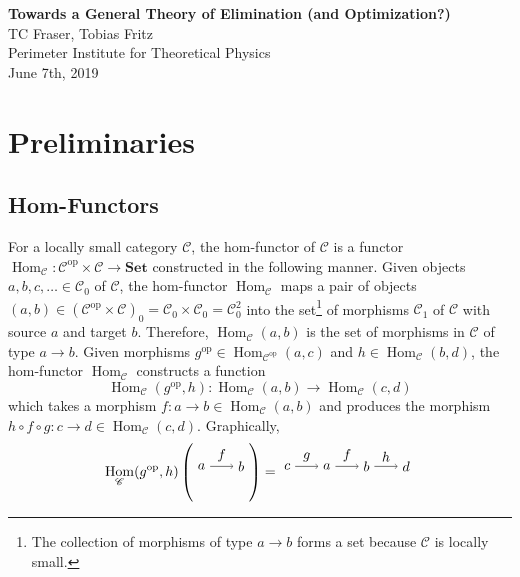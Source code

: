 \documentclass[12pt]{article}
\theoremstyle{definition}
\theoremstyle{remark}
\newcommand{\opcat}{\mathrm{op}}
\DeclareMathOperator{\Hom}{Hom}
\begin{document}
\begin{center}
    \large{\textbf{Towards a General Theory of Elimination (and Optimization?)}} \\
    \normalsize{TC Fraser, Tobias Fritz} \\
    \normalsize{Perimeter Institute for Theoretical Physics} \\
    \normalsize{June 7th, 2019}
\end{center}

\newcommand{\catA}{\mathscr{A}}
\newcommand{\catB}{\mathscr{B}}
\newcommand{\catC}{\mathscr{C}}
\newcommand{\catD}{\mathscr{D}}
\newcommand{\catE}{\mathscr{E}}

\section{Preliminaries}

\subsection{Hom-Functors}
For a locally small category $\catC$, the hom-functor of $\catC$ is a functor $\Hom_{\catC} : \catC^{\opcat} \times \catC \to \mathbf{Set}$ constructed in the following manner. Given objects $a,b,c,\ldots \in \catC_0$ of $\catC$, the hom-functor $\Hom_{\catC}$ maps a pair of objects $(a,b) \in (\catC^\opcat \times \catC)_0 = \catC_0 \times \catC_0 = \catC_0^2$ into the set\footnote{The collection of morphisms of type $a \to b$ forms a set because $\catC$ is locally small.} of morphisms $\catC_1$ of $\catC$ with source $a$ and target $b$. Therefore, $\Hom_{\catC}(a,b)$ is the set of morphisms in $\catC$ of type $a \to b$. Given morphisms $g^{\opcat} \in \Hom_{\catC^{\opcat}}(a,c)$ and $h \in \Hom_{\catC}(b,d)$, the hom-functor $\Hom_{\catC}$ constructs a function
\[ \Hom_{\catC}(g^{\opcat}, h) : \Hom_{\catC}(a,b) \to \Hom_{\catC}(c,d) \]
which takes a morphism $f : a \to b \in \Hom_{\catC}(a,b)$ and produces the morphism $h \circ f \circ g : c \to d \in \Hom_{\catC}(c,d)$. Graphically,
\[
    \Hom_{\catC}(g^{\opcat}, h)
    \left(
    \begin{tikzpicture}
        \draw (0,0) node(a){$a$};
        \draw (1,0) node(b){$b$};
        \draw[->] (a) to node[above, midway]{$f$} (b);
    \end{tikzpicture}
    \right)
    =
    \begin{tikzpicture}
        \draw (0,0) node(c){$c$};
        \draw (1,0) node(a){$a$};
        \draw (2,0) node(b){$b$};
        \draw (3,0) node(d){$d$};
        \draw[->] (c) to node[above, midway]{$g$} (a);
        \draw[->] (a) to node[above, midway]{$f$} (b);
        \draw[->] (b) to node[above, midway]{$h$} (d);
    \end{tikzpicture}
\]
\end{document}
